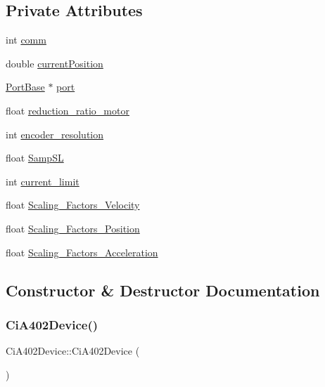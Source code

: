 \subsection*{Private Attributes}
\begin{DoxyCompactItemize}
\item 
int \hyperlink{classCiA402Device_a4e7a5a225fb27f5f02aeb0e6df38cd1f}{comm}
\item 
double \hyperlink{classCiA402Device_adb251ae496aeca707dcc51b43c64d0b8}{current\+Position}
\item 
\hyperlink{classPortBase}{Port\+Base} $\ast$ \hyperlink{classCiA402Device_abc96eb117cc948d86e3bd4c07c7fe807}{port}
\item 
float \hyperlink{classCiA402Device_ad433f5fc62f2f7e78815807418ada3ba}{reduction\+\_\+ratio\+\_\+motor}
\item 
int \hyperlink{classCiA402Device_aab8a459615d73c60728344aaedc9f66c}{encoder\+\_\+resolution}
\item 
float \hyperlink{classCiA402Device_a5d0d4f4f4fcb7413e5de0270341fb209}{Samp\+SL}
\item 
int \hyperlink{classCiA402Device_a3dfe8b82f4049137b0992934a9239053}{current\+\_\+limit}
\item 
float \hyperlink{classCiA402Device_a57db6ccb730d3c26b7b33000d371b3bf}{Scaling\+\_\+\+Factors\+\_\+\+Velocity}
\item 
float \hyperlink{classCiA402Device_af6df63ddd2ddc1953f847855436ef129}{Scaling\+\_\+\+Factors\+\_\+\+Position}
\item 
float \hyperlink{classCiA402Device_a59de671e30be6f3f8f4c6ede7595d16c}{Scaling\+\_\+\+Factors\+\_\+\+Acceleration}
\end{DoxyCompactItemize}


\subsection{Constructor \& Destructor Documentation}
\mbox{\label{classCiA402Device_a894ef30b3c5a0ed291b086ad2156e4c1}} 
\subsubsection{\texorpdfstring{Ci\+A402\+Device()}{CiA402Device()}\hspace{0.1cm}{\footnotesize\ttfamily [1/5]}}
{\footnotesize\ttfamily Ci\+A402\+Device\+::\+Ci\+A402\+Device (\begin{DoxyParamCaption}{ }\end{DoxyParamCaption})}


